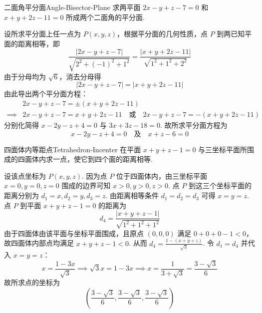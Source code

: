 \begin{problem}{二面角平分面}{Angle-Bisector-Plane}
    求两平面 $2x - y + z - 7 = 0$ 和 $x + y + 2z - 11 = 0$ 所成两个二面角的平分面.
\end{problem}

\begin{solution}
    设所求平分面上任一点为 $P(x, y, z)$，根据平分面的几何性质，点 $P$ 到两已知平面的距离相等，即
    \begin{equation}
        \frac{|2x - y + z - 7|}{\sqrt{2^2 + (-1)^2 + 1^2}} = \frac{|x + y + 2z - 11|}{\sqrt{1^2 + 1^2 + 2^2}}
    \end{equation}
    由于分母均为 $\sqrt{6}$，消去分母得
    \begin{equation}
        |2x - y + z - 7| = |x + y + 2z - 11|
    \end{equation}
    由此导出两个平分面方程：
    \begin{equation}
        \begin{aligned}
                     & 2x - y + z - 7 = \pm(x + y + 2z - 11)                                                     \\
            \implies & 2x - y + z - 7 = x + y + 2z - 11 \quad \text{或} \quad 2x - y + z - 7 = -(x + y + 2z - 11)
        \end{aligned}
    \end{equation}
    分别化简得 $x - 2y - z + 4 = 0$ 与 $3x + 3z - 18 = 0$.
    故所求平分面方程为
    \begin{equation}
        \boxed{x - 2y - z + 4 = 0 \quad \text{及} \quad x + z - 6 = 0}
    \end{equation}
\end{solution}

\begin{problem}{四面体内等距点}{Tetrahedron-Incenter}
    在平面 $x + y + z - 1 = 0$ 与三坐标平面所围成的四面体内求一点，使它到四个面的距离相等.
\end{problem}

\begin{solution}
    设该点坐标为 $P(x, y, z)$. 因为点 $P$ 位于四面体内，由三坐标平面 $x=0, y=0, z=0$ 围成的边界可知 $x > 0, y > 0, z > 0$.
    点 $P$ 到这三个坐标平面的距离分别为 $d_1 = x, d_2 = y, d_3 = z$.
    由距离相等条件 $d_1 = d_2 = d_3$ 可得 $x = y = z$.
    点 $P$ 到平面 $x + y + z - 1 = 0$ 的距离为
    \begin{equation}
        d_4 = \frac{|x + y + z - 1|}{\sqrt{1^2 + 1^2 + 1^2}}
    \end{equation}
    由于四面体由该平面与坐标平面围成，且原点 $(0,0,0)$ 满足 $0+0+0-1 < 0$，故四面体内部点均满足 $x + y + z - 1 < 0$.
    从而 $d_4 = \frac{1 - (x + y + z)}{\sqrt{3}}$. 令 $d_1 = d_4$ 并代入 $x = y = z$：
    \begin{equation}
        x = \frac{1 - 3x}{\sqrt{3}} \implies \sqrt{3}x = 1 - 3x \implies x = \frac{1}{3 + \sqrt{3}} = \frac{3 - \sqrt{3}}{6}
    \end{equation}
    故所求点的坐标为
    \begin{equation}
        \boxed{\left( \frac{3 - \sqrt{3}}{6}, \frac{3 - \sqrt{3}}{6}, \frac{3 - \sqrt{3}}{6} \right)}
    \end{equation}
\end{solution}


